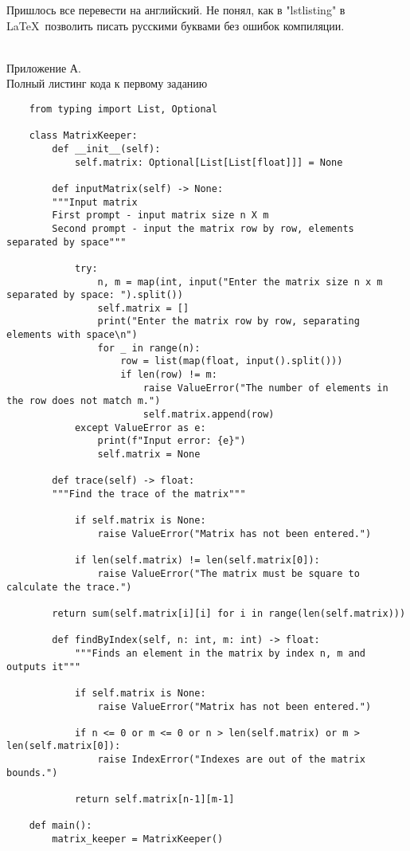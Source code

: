 Пришлось все перевести на английский. Не понял, как в "lstlisting" в \LaTeX \ позволить писать русскими буквами без ошибок компиляции.\\ \\
\centering\begin{large}
	{Приложение А.\\
		 Полный листинг кода к первому заданию}\\
\end{large}

\begin{lstlisting}
	from typing import List, Optional
	
	class MatrixKeeper:
		def __init__(self):
			self.matrix: Optional[List[List[float]]] = None
		
		def inputMatrix(self) -> None:
		"""Input matrix
		First prompt - input matrix size n X m
		Second prompt - input the matrix row by row, elements separated by space"""
		
			try:
				n, m = map(int, input("Enter the matrix size n x m separated by space: ").split())
				self.matrix = []
				print("Enter the matrix row by row, separating elements with space\n")
				for _ in range(n):
					row = list(map(float, input().split()))
					if len(row) != m:
						raise ValueError("The number of elements in the row does not match m.")
						self.matrix.append(row)
			except ValueError as e:
				print(f"Input error: {e}")
				self.matrix = None
		
		def trace(self) -> float:
		"""Find the trace of the matrix"""
		
			if self.matrix is None:
				raise ValueError("Matrix has not been entered.")
			
			if len(self.matrix) != len(self.matrix[0]):
				raise ValueError("The matrix must be square to calculate the trace.")
		
		return sum(self.matrix[i][i] for i in range(len(self.matrix)))
		
		def findByIndex(self, n: int, m: int) -> float:
			"""Finds an element in the matrix by index n, m and outputs it"""
		
			if self.matrix is None:
				raise ValueError("Matrix has not been entered.")
		
			if n <= 0 or m <= 0 or n > len(self.matrix) or m > len(self.matrix[0]):
				raise IndexError("Indexes are out of the matrix bounds.")
		
			return self.matrix[n-1][m-1]
		
	def main():
		matrix_keeper = MatrixKeeper()
		

\end{lstlisting}
